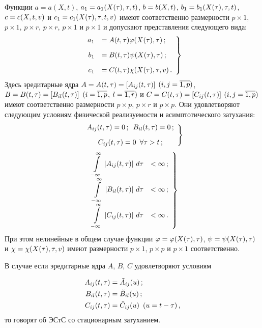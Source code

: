 \begin{multicols}{2}
Функции $a=a(X, t)$, $a_1 \hm= a_1(X (\tau),\tau, t)$, $b\hm=b(X, t)$,
$b_1 \hm= b_1(X (\tau),\tau, t)$, $c\hm=c(X,t,v)$ и
$c_1 \hm= c_1(X (\tau),\tau, t,v)$ имеют соответственно размерности
$p\times 1$, $p\times 1$, $p\times r$, $p\times r$, $p\times 1$ и
$p\times 1$ и допускают представления следующего вида:
    \begin{equation}
    \left.
    \begin{array}{rl}
    a_1&=A(t,\tau) \varphi (X(\tau) , \tau)\,;\\[9pt]
    b_1&=B(t,\tau) \psi (X(\tau) ,  \tau)\,;\\[9pt]
    c_1&=C(t,\tau) \chi (X(\tau) ,  \tau, v)\,.
    \end{array}
    \right\}
    \label{e4.2-s}
    \end{equation}
Здесь эредитарные ядра $A\hm=A(t,\tau)\hm=\lk A_{ij}(t,\tau)\rk$
$(i,j\hm=\overline{1,p})$,
$B\hm=B(t,\tau)\hm=\lk B_{i l}(t,\tau)\rk$ $(i\hm=\overline{1,p}$,
$l\hm=\overline{1,r})$ и $C\hm=C(t,\tau)=\lk C_{ij}(t,\tau)\rk$
$(i,j\hm=\overline{1,p})$ имеют соответственно размерности
$p\times p$, $p\times r$ и $p\times p$. Они удовлетворяют следующим условиям
физической реализуемости и асимптотического затухания:
    \begin{equation}
    \left.
    \begin{array}{c}
    A_{ij}(t,\tau)=0\,;\enskip
    B_{i l}(t,\tau)=0\,;\\[9pt]
    C_{ij}(t,\tau)=0\enskip \forall \tau >t\,;
    \end{array}
    \right\}
    \label{e4.3-s}
    \end{equation}
\begin{equation}
\left.
\begin{array}{rl}
\displaystyle\int\limits_{-\infty}^\infty \,\left\vert A_{ij} (t,\tau) \right\vert\, d\tau &<\infty \,;\\[9pt]
\displaystyle\int\limits_{-\infty}^\infty \,\left\vert B_{i l} (t,\tau) \right\vert\, d\tau &<\infty \,;\\[9pt]
\displaystyle \int\limits_{-\infty}^\infty \,\left\vert C_{ij} (t,\tau) \right\vert\, d\tau &<\infty\,.
 \end{array}
 \right\}
 \label{e4.4-s}
 \end{equation}
При этом нелинейные в общем случае функции
$\vrp\hm=\vrp(X(\tau),\tau)$, $\psi \hm=\psi(X(\tau), \tau)$ и $\chi \hm=\chi
(X(\tau),  \tau, v)$ имеют размерности $p\times 1$, $p\times p$ и
$p\times 1$ соответст\-венно.

В случае если эредитарные ядра $A$, $B$, $C$ удовле\-тво\-ря\-ют условиям

\noindent
    \begin{align*}
    A_{ij} (t,\tau) &=\tilde A_{ij} (u)\,;\\
 B_{i l} (t,\tau) &=\tilde B_{i l} (u)\,;\\
    C_{ij} (t,\tau)& =\tilde C_{ij} (u)\enskip (u=t-\tau)\,,
    \end{align*}
то говорят об ЭСтС со стационарным затуханием.


\end{multicols}
